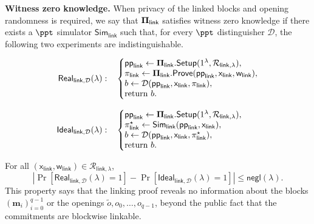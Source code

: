 \documentclass[conference,compsoc]{IEEEtran}
\newcommand{\para}{\textsf{pp}}
\newcommand{\vect}{\mathbf}         %
\newcommand{\bPi}{{\bf \Pi}}
\newcommand{\setup}{{\sf Setup}}
\newcommand{\prove}{{\sf Prove}}
\newcommand{\relation}{{\mathcal{R}}}
\newcommand{\stmt}{\mathsf{x}}      %
\newcommand{\wit}{\mathsf{w}}       %
\theoremstyle{plain}
\theoremstyle{definition}
\theoremstyle{remark}
\begin{document}
\noindent\textbf{Witness zero knowledge.}
When privacy of the linked blocks and opening randomness is required, we say
that \(\bPi_{\mathsf{link}}\) satisfies witness zero knowledge if there exists a
\(\ppt\) simulator \(\mathsf{Sim}_{\mathsf{link}}\) such that, for every
\(\ppt\) distinguisher \(\mathcal{D}\), the following two experiments are
indistinguishable.

\[
\begin{aligned}
\mathsf{Real}_{\mathsf{link},\mathcal{D}}(\lambda):
\quad
&\left\{
\begin{array}{@{}l@{}}
  \para_{\mathsf{link}}
    \gets
    \bPi_{\mathsf{link}}.\setup(
      1^\lambda,\relation_{\mathsf{link},\lambda}
    ),\\
  \pi_{\mathsf{link}}
    \gets
    \bPi_{\mathsf{link}}.\prove(
      \para_{\mathsf{link}},
      \stmt_{\mathsf{link}},
      \wit_{\mathsf{link}}
    ),\\
  b\gets
    \mathcal{D}(
      \para_{\mathsf{link}},
      \stmt_{\mathsf{link}},
      \pi_{\mathsf{link}}
    ),\\
  \text{return } b.
\end{array}
\right.
\\[3mm]
\mathsf{Ideal}_{\mathsf{link},\mathcal{D}}(\lambda):
\quad
&\left\{
\begin{array}{@{}l@{}}
  \para_{\mathsf{link}}
    \gets
    \bPi_{\mathsf{link}}.\setup(
      1^\lambda,\relation_{\mathsf{link},\lambda}
    ),\\
  \pi_{\mathsf{link}}^\star
    \gets
    \mathsf{Sim}_{\mathsf{link}}(
      \para_{\mathsf{link}},
      \stmt_{\mathsf{link}}
    ),\\
  b\gets
    \mathcal{D}(
      \para_{\mathsf{link}},
      \stmt_{\mathsf{link}},
      \pi_{\mathsf{link}}^\star
    ),\\
  \text{return } b.
\end{array}
\right.
\end{aligned}
\]

For all
\((\stmt_{\mathsf{link}},\wit_{\mathsf{link}})
\in\relation_{\mathsf{link},\lambda}\),
\[
\left|
  \Pr[\mathsf{Real}_{\mathsf{link},\mathcal{D}}(\lambda)=1]
  -
  \Pr[\mathsf{Ideal}_{\mathsf{link},\mathcal{D}}(\lambda)=1]
\right|
\le
\textsf{negl}(\lambda).
\]
This property says that the linking proof reveals no information about
the blocks \((\vect{m}_i)_{i=0}^{q-1}\) or the openings
\(\widetilde{o},o_0,\ldots,o_{q-1}\), beyond the public fact that the
commitments are blockwise linkable.
\end{document}
